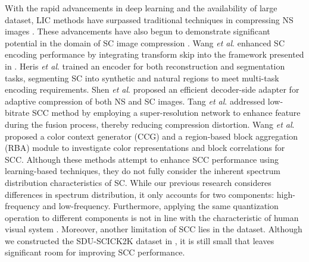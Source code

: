 With the rapid advancements in deep learning and the availability of large dataset, LIC methods have surpassed traditional techniques in compressing NS images \cite{cheng2020learned, balle2018variational, minnen2018joint, pan2024JND-LIC, he2024learnedimage}. These advancements have also begun to demonstrate significant potential in the domain of SC image compression \cite{wang2022transform, heris2023multi, shen2023dec, tang2023feature, WangDSCIC}. Wang \textit{et al}. \cite{wang2022transform} enhanced SC encoding performance by integrating transform skip into the framework presented in \cite{balle2018variational}. Heris \textit{et al}. \cite{heris2023multi} trained an encoder for both reconstruction and segmentation tasks, segmenting SC into synthetic and natural regions to meet multi-task encoding requirements. Shen \textit{et al}. \cite{shen2023dec} proposed an efficient decoder-side adapter for adaptive compression of both NS and SC images. Tang \textit{et al}. \cite{tang2023feature} addressed low-bitrate SCC method by employing a super-resolution network to enhance feature during the fusion process, thereby reducing compression distortion. Wang \textit{et al}. \cite{WangDSCIC} proposed a color context generator (CCG) and a region-based block aggregation (RBA) module to investigate color representations
and block correlations for SCC. Although these methods attempt to enhance SCC performance using learning-based techniques, they do not fully consider the inherent spectrum distribution characteristics of SC. While our previous research \cite{jiang2024OMR} consideres differences in spectrum distribution, it only accounts for two components: high-frequency and low-frequency. Furthermore, applying the same quantization operation to different components is not in line with the characteristic of human visual system \cite{pointer1989contrast}. Moreover, another limitation of SCC lies in the dataset. Although we constructed the SDU-SCICK2K dataset in \cite{jiang2024OMR}, it is still small that leaves significant room for improving SCC performance.

